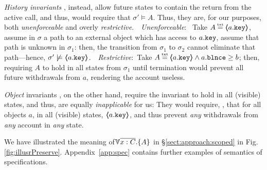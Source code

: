 {\emph{History  invariants}} \cite{liskov94behavioral,usinghistory,Cohen10}, instead, allow future states to contain the return from the active call, and thus, {would  require that   $\sigma' \models A$. Thus, they are,}  for our purposes,  both
 \emph{unenforceable} and overly \emph{restrictive}.\ \  \emph{Unenforceable}: \ Take $A \txteq \inside{a.\prg{key}}$,  assume  in $\sigma$ a path to an external object which has access to $a.\mbox{\normalfont{\texttt{key}}}$, assume that path is unknown in $\sigma_1$: then, the transition from $\sigma_1$ to $\sigma_2$ cannot eliminate that path—hence, $\sigma' \not\models \langle\!\!\langle a.\mbox{\normalfont{\texttt{key}}} \rangle\!\!\rangle$.\ \  \emph{Restrictive}:\ Take $A \txteq \inside{a.\prg{key}}\wedge a.\prg{blnce}\geq b$; then,  requiring  $A$   to hold in all states from $\sigma_1$ until termination would prevent all future withdrawals from $a$, rendering the account useless.

{\emph{Object}} invariants  \cite{Meyer92,MeyerDBC92,BarDelFahLeiSch04,objInvars,MuellerPoetzsch-HeffterLeavens06}, on the other hand, require the invariant to hold in all (visible) states, and thus,  are equally \emph{inapplicable} for us: They would require, \eg, that for all objects $a$, in all (visible) states, $\langle\!\!\langle a.\mbox{\normalfont{\texttt{key}}} \rangle\!\!\rangle$, and thus prevent \emph{any} withdrawals from \emph{any} account in \emph{any} state.

\vspace{.1cm}




 We have illustrated  the meaning of ${\TwoStatesN {\overline {x:C}} {A}}$ in \S \ref{sect:approach:scoped} in Fig. \ref{fig:illusrPreserve}. %
%
{Appendix~\ref{app:spec} contains further examples of semantics of specifications.}

